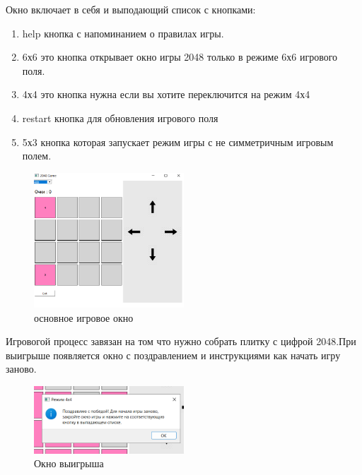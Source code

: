 Окно включает в себя и выподающий список с кнопками:
\begin{enumerate}
\item  help кнопка с напоминанием о правилах игры.
\item  6х6 это кнопка открывает окно игры 2048 только в режиме 6х6 игрового поля.
\item  4х4 это кнопка нужна если вы хотите переключится на режим 4х4
\item restart кнопка для обновления игрового поля 
\item  5х3 кнопка которая запускает режим игры с не симметричным игровым полем.
\end{enumerate}
\begin{figure}[ht]
    \centering
    \includegraphics[width=0.5\textwidth]{images/1.png}
    \caption{основное игровое окно}
    \label{fig:enter-label}
\end{figure}
Игровогой процесс завязан на том что нужно собрать плитку с цифрой 2048.При выигрыше появляется окно с поздравлением и инструкциями как начать игру заново.
\begin{figure}[ht]
    \centering
    \includegraphics[width=0.5\textwidth]{images/3.png}
    \caption{Окно выигрыша}
    \label{fig:enter-label}
\end{figure}

